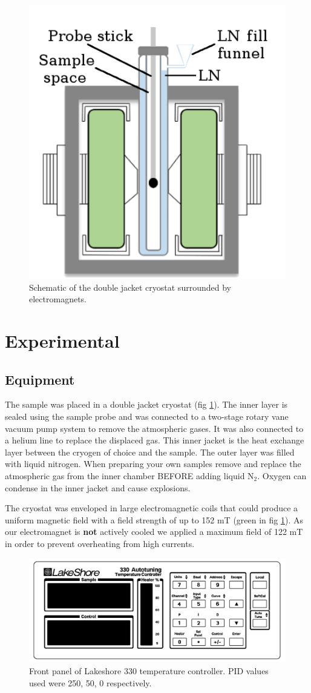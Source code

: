 \documentclass[
reprint,
amsmath,amssymb,
aps,
tikz,
border=5pt
]{revtex4-1}
\begin{document}
    \begin{figure}[h]
      \includegraphics[width=0.35 \textwidth]{figures/cryostat.png}
      \caption{Schematic of the double jacket cryostat surrounded by electromagnets.}
      \label{fig:cryostat}
    \end{figure}

\section*{Experimental }

  \subsection*{Equipment}
    The sample was placed in a double jacket cryostat (fig \ref{fig:cryostat}). The inner layer is sealed using the sample probe and was connected to a  two-stage rotary vane vacuum pump system to remove the atmospheric gases. It was also connected to a helium line to replace the displaced gas. This inner jacket is the heat exchange layer between the cryogen of choice and the sample. The outer layer was filled with liquid nitrogen. When preparing your own samples remove and replace the atmospheric gas from the inner chamber BEFORE adding liquid N$_2$. Oxygen can condense in the inner jacket and cause explosions. 
    
    
    The cryostat was enveloped in large electromagnetic coils that could produce a uniform magnetic field with a field strength of up to 152 mT (green in fig \ref{fig:cryostat}). As our electromagnet is \textbf{not} actively cooled we applied a maximum field of 122 mT in order to prevent overheating from high currents.


    \begin{figure}[b]
      \includegraphics[width=0.5 \textwidth]{figures/lakeshore.png}
      \caption{Front panel of Lakeshore 330 temperature controller. PID values used were 250, 50, 0 respectively.}
      \label{fig:lakeshore}
    \end{figure}
\end{document}
